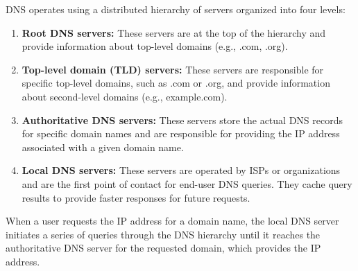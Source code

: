 DNS operates using a distributed hierarchy of servers organized into four levels:

\vspace{-0.5em}
\begin{enumerate}
    \item \textbf{Root DNS servers:} These servers are at the top of the hierarchy and provide information about top-level domains (e.g., .com, .org).
    \item \textbf{Top-level domain (TLD) servers:} These servers are responsible for specific top-level domains, such as .com or .org, and provide information about second-level domains (e.g., example.com).
    \item \textbf{Authoritative DNS servers:} These servers store the actual DNS records for specific domain names and are responsible for providing the IP address associated with a given domain name.
    \item \textbf{Local DNS servers:} These servers are operated by ISPs or organizations and are the first point of contact for end-user DNS queries. They cache query results to provide faster responses for future requests.
\end{enumerate}

\noindent When a user requests the IP address for a domain name, the local DNS server initiates a series of queries through the DNS hierarchy until it reaches the authoritative DNS server for the requested domain, which provides the IP address.

